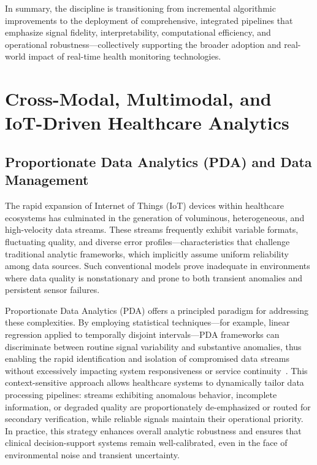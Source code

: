 \documentclass[sigconf]{acmart}
\begin{document}
In summary, the discipline is transitioning from incremental algorithmic improvements to the deployment of comprehensive, integrated pipelines that emphasize signal fidelity, interpretability, computational efficiency, and operational robustness—collectively supporting the broader adoption and real-world impact of real-time health monitoring technologies.

\section{Cross-Modal, Multimodal, and IoT-Driven Healthcare Analytics}

\subsection{Proportionate Data Analytics (PDA) and Data Management}

The rapid expansion of Internet of Things (IoT) devices within healthcare ecosystems has culminated in the generation of voluminous, heterogeneous, and high-velocity data streams. These streams frequently exhibit variable formats, fluctuating quality, and diverse error profiles---characteristics that challenge traditional analytic frameworks, which implicitly assume uniform reliability among data sources. Such conventional models prove inadequate in environments where data quality is nonstationary and prone to both transient anomalies and persistent sensor failures. 

Proportionate Data Analytics (PDA) offers a principled paradigm for addressing these complexities. By employing statistical techniques---for example, linear regression applied to temporally disjoint intervals---PDA frameworks can discriminate between routine signal variability and substantive anomalies, thus enabling the rapid identification and isolation of compromised data streams without excessively impacting system responsiveness or service continuity~\cite{ref106}. This context-sensitive approach allows healthcare systems to dynamically tailor data processing pipelines: streams exhibiting anomalous behavior, incomplete information, or degraded quality are proportionately de-emphasized or routed for secondary verification, while reliable signals maintain their operational priority. In practice, this strategy enhances overall analytic robustness and ensures that clinical decision-support systems remain well-calibrated, even in the face of environmental noise and transient uncertainty.
\end{document}

